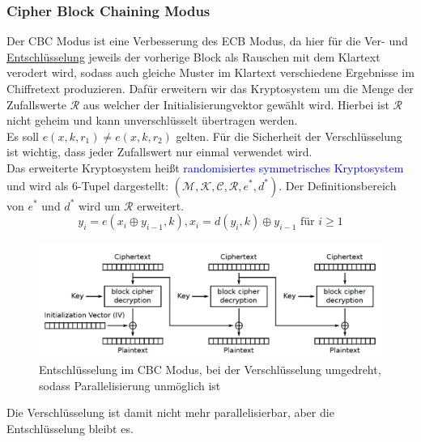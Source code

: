 \documentclass[a4paper,12pt,leqno]{article}
\newcommand{\blue}[1]{\textcolor{blue}{#1}}
\begin{document}
\subsubsection{Cipher Block Chaining Modus}
Der CBC Modus ist eine Verbesserung des ECB Modus, da hier für die Ver- und \hyperref[fig:CBCModus]{Entschlüsselung} jeweils der vorherige Block als Rauschen mit dem Klartext verodert wird, sodass auch gleiche Muster im Klartext verschiedene Ergebnisse im Chiffretext produzieren. Dafür erweitern wir das Kryptosystem um die Menge der Zufallswerte $\mathcal{R}$ aus welcher der Initialisierungvektor gewählt wird. Hierbei ist $\mathcal{R}$ nicht geheim und kann unverschlüsselt übertragen werden.\\
Es soll $e(x,k,r_1)\neq e(x,k,r_2)$ gelten. Für die Sicherheit der Verschlüsselung ist wichtig, dass jeder Zufallswert nur einmal verwendet wird.\\
Das erweiterte Kryptosystem heißt \blue{randomisiertes symmetrisches Kryptosystem} und wird als 6-Tupel dargestellt: $(\mathcal{M},\mathcal{K},\mathcal{C},\mathcal{R},e^*,d^*)$. Der Definitionsbereich von $e^*$ und $d^*$ wird um $\mathcal{R}$ erweitert.
$$y_i = e(x_i\oplus y_{i-1},k), x_i = d(y_i,k)\oplus y_{i-1} \textrm{ für } i\geq 1$$
\begin{figure}
\centering
\includegraphics[scale=0.5]{Grafiken/CBCModus.png}
\caption{Entschlüsselung im CBC Modus, bei der Verschlüsselung umgedreht, sodass Parallelisierung unmöglich ist}
\label{fig:CBCModus}
\end{figure}
Die Verschlüsselung ist damit nicht mehr parallelisierbar, aber die Entschlüsselung bleibt es.\\
\end{document}
